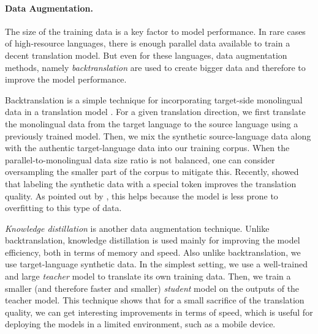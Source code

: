 \paragraph{Data Augmentation.} The size of the training data is a key factor to
model performance. In rare cases of high-resource languages, there is enough
parallel data available to train a decent translation model. But even for these
languages, data augmentation methods, namely \emph{backtranslation} are used
to create bigger data and therefore to improve the model performance.

Backtranslation is a simple technique for incorporating target-side monolingual
data in a translation model
\citep{bojar-tamchyna-2011-improving,sennrich-etal-2016-improving}. For a given
translation direction, we first translate the monolingual data from the target
language to the source language using a previously trained model. Then, we mix
the synthetic source-language data along with the authentic target-language
data into our training corpus. When the parallel-to-monolingual data size ratio
is not balanced, one can consider oversampling the smaller part of the corpus
to mitigate this. Recently, \citet{caswell-etal-2019-tagged} showed that
labeling the synthetic data with a special token improves the translation
quality. As pointed out by \citet{marie-etal-2020-tagged}, this helps because
the model is less prone to overfitting to this type of data.

\emph{Knowledge distillation} \citep{kim-rush-2016-sequence} is another data
augmentation technique. Unlike backtranslation, knowledge distillation is used
mainly for improving the model efficiency, both in terms of memory and speed.
Also unlike backtranslation, we use target-language synthetic data. In the
simplest setting, we use a well-trained and large \emph{teacher} model to
translate its own training data. Then, we train a smaller (and therefore faster
and smaller) \emph{student} model on the outputs of the teacher model. This
technique shows that for a small sacrifice of the translation quality, we can
get interesting improvements in terms of speed, which is useful for deploying
the models in a limited environment, such as a mobile device.

